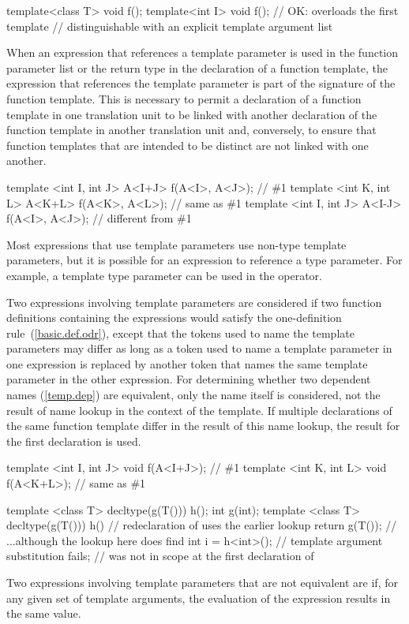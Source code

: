 \begin{codeblock}
template<class T> void f();
template<int I> void f();       // OK: overloads the first template
                                // distinguishable with an explicit template argument list
\end{codeblock}
\exitnote

\pnum
When an expression that references a template parameter is used in the
function parameter list or the return type in the declaration of a
function template, the expression that references the template
parameter is part of the signature of the function template.
This is
necessary to permit a declaration of a function template in one
translation unit to be linked with another declaration of the function
template in another translation unit and, conversely, to ensure that
function templates that are intended to be distinct are not linked
with one another.
\enterexample

\begin{codeblock}
template <int I, int J> A<I+J> f(A<I>, A<J>);   // \#1
template <int K, int L> A<K+L> f(A<K>, A<L>);   // same as \#1
template <int I, int J> A<I-J> f(A<I>, A<J>);   // different from \#1
\end{codeblock}
\exitexample
\enternote
Most expressions that use template parameters use non-type template
parameters, but it is possible for an expression to reference a type
parameter.
For example, a template type parameter can be used in the
 operator.
\exitnote

\pnum
Two expressions involving template parameters are considered
if two function definitions containing the expressions would satisfy
the one-definition rule~(\ref{basic.def.odr}), except that the tokens used
to name the template parameters may differ as long as a token used to
name a template parameter in one expression is replaced by another token
that names the same template parameter in the other expression. For
determining whether two dependent names (\ref{temp.dep}) are
equivalent, only the name itself is considered, not the result of name
lookup in the context of the template. If multiple declarations of the
same function template differ in the result of this name lookup, the
result for the first declaration is used.
\enterexample

\begin{codeblock}
template <int I, int J> void f(A<I+J>);         // \#1
template <int K, int L> void f(A<K+L>);         // same as \#1

template <class T> decltype(g(T())) h();
int g(int);
template <class T> decltype(g(T())) h()         // redeclaration of  uses the earlier lookup
  { return g(T()); }                            // ...although the lookup here does find 
int i = h<int>();                               // template argument substitution fails; 
                                                // was not in scope at the first declaration of 
\end{codeblock}
\exitexample
Two expressions involving template parameters that are not equivalent are
if, for any given set of template arguments, the evaluation of the
expression results in the same value.


